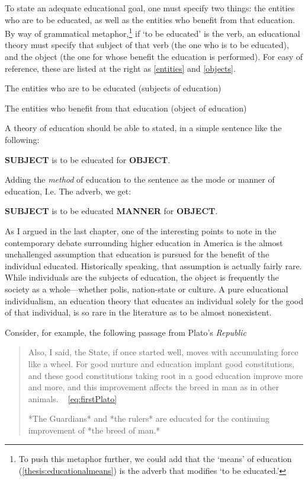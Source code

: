 To state an adequate educational goal, one must specify two things: the entities who are to be educated, as well as the entities who benefit from that education. By way of grammatical metaphor,\footnote{To push this metaphor further, we could add that the `means' of education (\ref{thesis:educationalmeans}) is the adverb that modifies `to be educated.'} if `to be educated' is the verb, an educational theory must specify that subject of that verb (the one who is to be educated), and the object (the one for whose benefit the education is performed). For easy of reference, these are listed at the right as \ref{entities} and \ref{objects}. \begin{entities}The entities who are to be educated (subjects of education)\end{entities}\begin{objects}The entities who benefit from that education (object of education)\end{objects}

A theory of education should be able to stated, in a simple sentence like the following:

\textbf{SUBJECT} is to be educated for \textbf{OBJECT}.

Adding the \emph{method} of education to the sentence as the mode or manner of education, I.e. The adverb, we get:

\textbf{SUBJECT} is to be educated \textbf{MANNER} for \textbf{OBJECT}.

As I argued in the last chapter, one of the interesting points to note in the contemporary debate surrounding higher education in America is the almost unchallenged assumption that education is pursued for the benefit of the individual educated. Historically speaking, that assumption is actually fairly rare. While individuals are the subjects of education, the object is frequently the society as a whole---whether polis, nation-state or culture. A pure educational individualism, an education theory that educates an individual solely for the good of that individual, is so rare in the literature as to be almost nonexistent. 

Consider, for example, the following passage from Plato's \emph{Republic}

\begin{quote}

Also, I said, the State, if once started well, moves with accumulating force like a wheel. For good nurture and education implant good constitutions, and these good constitutions taking root in a good education improve more and more, and this improvement affects the breed in man as in other animals. ~\citep{Plato:1994ug} \ref{eq:firstPlato} 
\begin{purpose}\label{eq:firstPlato}
*The Guardians* and *the rulers* are educated for the continuing improvement of *the breed of man.*\end{purpose}
 
\end{quote}

